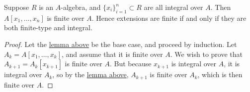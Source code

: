 \begin{corollary}\label{cor:finite-type-integral}
    Suppose \(R\) is an \(A\)-algebra,
    and \({\{x_i\}}_{i=1}^n \subset R\) are all integral over \(A\).
    Then \(A[x_1,\hdots,x_n]\) is finite over \(A\).
    Hence extensions are finite if and only if they are both finite-type and integral.
\end{corollary}
\begin{proof}
    Let the \hyperref[lem:integral-finite]{lemma above} be the base case,
    and proceed by induction.
    Let \(A_k = A[x_1,\hdots,x_k]\), and assume that it is finite over \(A\).
    We wish to prove that \(A_{k+1} = A_k[x_{k+1}]\) is finite over \(A\).
    But because \(x_{k+1}\) is integral over \(A\), it is integral over \(A_k\),
    so by the \hyperref[lem:integral-finite]{lemma above},
    \(A_{k+1}\) is finite over \(A_k\), which is then finite over \(A\).
\end{proof}

